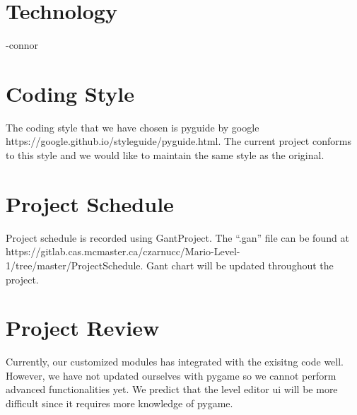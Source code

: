 \documentclass{article}
\begin{document}
\section{Technology}
-connor
\section{Coding Style}
The coding style that we have chosen is pyguide by google \\https://google.github.io/styleguide/pyguide.html. The current project conforms to this style and we would like to maintain the same style as the original.
\section{Project Schedule}
Project schedule is recorded using GantProject. The ``.gan'' file can be found at https://gitlab.cas.mcmaster.ca/czarnucc/Mario-Level-1/tree/master/ProjectSchedule. Gant chart will be updated throughout the project.

\section{Project Review}
Currently, our customized modules has integrated with the exisitng code well. However, we have not updated ourselves with pygame so we cannot perform advanced functionalities yet. We predict that the level editor ui will be more difficult since it requires more knowledge of pygame.
\end{document}

